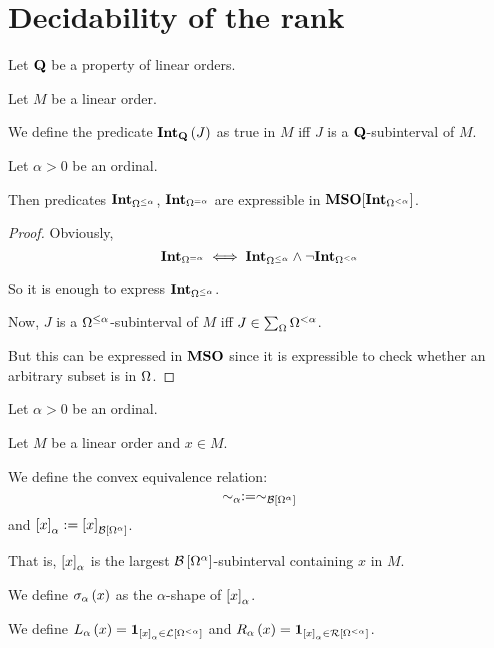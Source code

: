 \section{Decidability of the rank}

\begin{definition}
  Let $\mathbf{Q}$ be a property of linear orders.

  Let $M$ be a linear order.

  We define the predicate $\mathbf{Int}_{\mathbf{Q}} \left( {J} \right)$ as
  true in $M$ iff $J$ is a $\mathbf{Q}$-subinterval of $M$.
\end{definition}

\begin{lemma}
  Let $\alpha > 0$ be an ordinal.

  Then predicates $\mathbf{Int}_{\Omega^{\le \alpha}}$, $\mathbf{Int}_{\Omega^{= \alpha}}$
  are expressible in $\mathbf{MSO}[\mathbf{Int}_{\Omega^{< \alpha}}]$.
\end{lemma}

\begin{proof}
  Obviously, \[
    \mathbf{Int}_{\Omega^{= \alpha}}
    \iff \mathbf{Int}_{\Omega^{\le \alpha}} \wedge \neg \mathbf{Int}_{\Omega^{< \alpha}}
  \]

  So it is enough to express $\mathbf{Int}_{\Omega^{\le \alpha}}$.

  Now, $J$ is a $\Omega^{\le \alpha}$-subinterval of $M$ iff
  $J \in \sum_{\Omega}{\Omega^{< \alpha}}$.

  But this can be expressed in $\mathbf{MSO}$ since it is expressible
  to check whether an arbitrary subset is in $\Omega$.
\end{proof}

\begin{definition}
  Let $\alpha > 0$ be an ordinal.

  Let $M$ be a linear order and $x \in M$.

  We define the convex equivalence relation:
  \[\sim_\alpha := \sim_{\mathcal{B} \left[ {{\Omega^{\alpha}}} \right]}\]
  and $\left[ {x} \right]_{\alpha} := \left[ {x} \right]_{\mathcal{B} \left[ {{\Omega^{\alpha}}} \right]}$.

  That is,
  $\left[ {x} \right]_{\alpha}$ is the largest $\mathcal{B} \left[ {{\Omega^{\alpha}}} \right]$-subinterval
  containing $x$ in $M$.

  We define $\sigma_{\alpha} \left( {x} \right)$ as
  the $\alpha$-shape of $\left[ {x} \right]_{\alpha}$.

  We define
  $L_{\alpha} \left( {x} \right) = \mathbf{1}_{\left[ {x} \right]_{\alpha} \in \mathcal{L} \left[ {{\Omega^{< \alpha}}} \right]}$ and
  $R_{\alpha} \left( {x} \right) = \mathbf{1}_{\left[ {x} \right]_{\alpha} \in \mathcal{R} \left[ {{\Omega^{< \alpha}}} \right]}$.
\end{definition}

